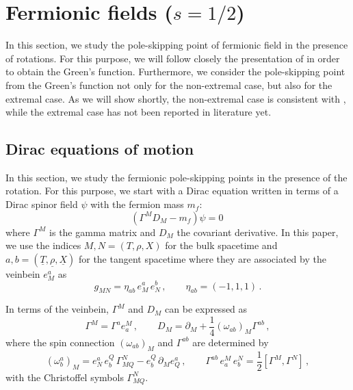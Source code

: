 \documentclass[11pt,a4paper]{article}
\begin{document}
%
\section{Fermionic fields ($s=1/2$)}\label{sec:Fermionic fields}

In this section, we study the pole-skipping point of fermionic field in the presence of rotations.
For this purpose, we will follow closely the presentation of \cite{Iqbal:2009fd} in order to obtain the Green's function.
Furthermore, we consider the pole-skipping point from the Green's function not only for the non-extremal case, but also for the extremal case. As we will show shortly, the non-extremal case is consistent with \cite{Ceplak:2019ymw}, while the extremal case has not been reported in literature yet.



%    
\subsection{Dirac equations of motion}
In this section, we study the fermionic pole-skipping points in the presence of the rotation. For this purpose, we start with a Dirac equation written in terms of a Dirac spinor field $\psi$ with the fermion mass $m_f$:
\begin{equation} \label{eq:DiracEqn}
    \left( \Gamma^M D_M - m_f \right) \psi = 0\,
\end{equation}
where $\Gamma^{M}$ is the gamma matrix and $D_M$ the covariant derivative.
In this paper, we use the indices $M, N=(T,\rho,X)$ for the bulk spacetime and $a, b=(\underline{T},\underline{\rho},\underline{X})$ for the tangent spacetime where they are associated by the veinbein $e^a_M$ as 
\begin{equation} \label{MEVER}
    g_{MN} = \eta_{ab} \, e^a_M \, e^b_N \,, \qquad \eta_{ab} = (-1,1,1) \,.
\end{equation}

In terms of the veinbein, $\Gamma^{M}$ and $D_M$ can be expressed as
\begin{equation} \label{}
    \Gamma^{M} = \Gamma^a e^M_a \,, \qquad D_M = \partial_M + \frac{1}{4} \left( \omega_{ab} \right)_M \Gamma^{ab} \,,
\end{equation}
where the spin connection $\left( \omega_{ab} \right)_M$ and $\Gamma^{ab}$ are determined by  
\begin{equation} \label{MEVERL}
 {
 (\omega^a_b)_M = e^a_N \, e^Q_b \, \Gamma^N_{MQ} - e^Q_b \, \partial_{M} e^a_Q \,,
 \qquad \Gamma^{ab} \, e^M_a \, e^N_b = \frac{1}{2} \left[\Gamma^M, \Gamma^N\right]} \,,
\end{equation}
with the Christoffel symbols $\Gamma^N_{MQ}$.
\end{document}
